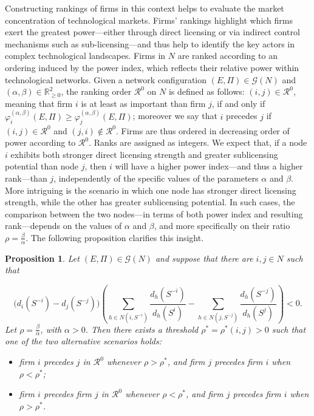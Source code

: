 \documentclass[preprint,11pt,authoryear]{elsarticle}
\theoremstyle{plain}
\newtheorem{proposition}[theorem]{Proposition}
\begin{document}
Constructing rankings of firms in this context helps to evaluate the market concentration of technological markets. Firms' rankings highlight which firms exert the greatest power—either through direct licensing or via indirect control mechanisms such as sub-licensing—and thus help to identify the key actors in complex technological landscapes. Firms in \( N \) are ranked according to an ordering induced by the power index, which reflects their relative power within  technological networks. Given a network configuration \( (E, \Pi) \in \mathcal{G}(N) \) and $(\alpha,\beta)\in\mathbb{R}_{\geq0}^2$, the ranking order \( \mathcal{R}^0 \) on $N$ is defined as follows: \( (i,j)\in \mathcal{R}^0\), meaning that firm \( i \) is at least as important than  firm \( j \), if and only if
$\varphi_i^{(\alpha,\beta)}(E, \Pi) \geq \varphi_j^{(\alpha,\beta)}(E, \Pi)$; moreover we say that $i$ precedes $j$ if $(i,j)\in  \mathcal{R}^0$ and $(j,i)\notin  \mathcal{R}^0$. Firms are thus ordered in decreasing order of power according to \( \mathcal{R}^0 \). Ranks are assigned as integers.
We expect that, if a node \( i \) exhibits both stronger direct licensing strength and greater sublicensing potential than node \( j \), then \( i \) will have a higher power index—and thus a higher rank—than \( j \), independently of the specific values of the parameters \( \alpha \) and \( \beta \). More intriguing is the scenario in which one node has stronger direct licensing strength, while the other has greater sublicensing potential. In such cases, the comparison between the two nodes—in terms of both power index and resulting rank—depends on the values of \( \alpha \) and \( \beta \), and more specifically on their ratio \( \rho = \frac{\beta}{\alpha} \).
The following proposition clarifies this insight.

\begin{proposition} \label{thm change}
Let $(E,\Pi)\in\mathcal{G}(N)$ and suppose that there are \( i, j \in N \) such that

\begin{equation} \label{assumption change}
\Big( d_i(S^{-i}) -d_j(S^{-j}) \Big)
\left(\sum_{h \in N(i, S^{-i})} \frac{d_h(S^{-i})}{d_h(S^{i})}-  
\sum_{h \in N(j, S^{-j})} \frac{d_h(S^{-j})}{d_h(S^{j})}
\right)<0.
\end{equation}
Let \( \rho = \frac{\beta}{\alpha} \), with $\alpha>0$.  Then there exists a threshold \( \rho^{*} = \rho^{*}(i, j) > 0 \) such that one of the two alternative scenarios holds:
\begin{itemize}
    \item[-] firm \( i \) precedes \( j \) in \( \mathcal{R}^{0} \) whenever \( \rho > \rho^{*} \), and firm \( j \) precedes firm \( i \) when \( \rho < \rho^{*} \);
    \item[-] firm \( i \) precedes firm \( j \) in \( \mathcal{R}^{0} \) whenever \( \rho < \rho^{*} \), and firm \( j \) precedes firm \( i \) when \( \rho > \rho^{*} \).
\end{itemize}
\end{proposition}
\end{document}
